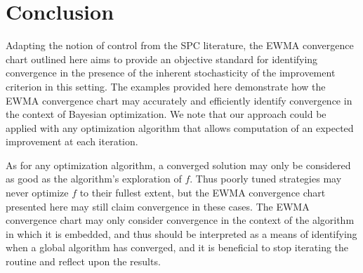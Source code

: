 \documentclass{article}
\begin{document}
%
%

%
%
\section{Conclusion}
%
%

%
Adapting the notion of control from the SPC literature, the EWMA convergence 
chart outlined here aims to provide an objective standard for identifying 
convergence in the presence of the inherent stochasticity of the improvement 
criterion in this setting. The examples provided here demonstrate how the EWMA 
convergence chart may accurately and efficiently identify convergence in the 
context of Bayesian optimization. We note that our approach could be 
applied with any optimization algorithm that allows computation of an expected 
improvement at each iteration.

%
%

As for any optimization algorithm, a converged solution may only be considered 
as good as the algorithm's exploration of $f$. Thus poorly tuned
strategies may never optimize $f$ to their fullest extent, but the  
EWMA convergence chart presented here may still claim convergence in these 
cases. The EWMA convergence chart may only consider convergence in the context 
of the algorithm in which it is embedded, and thus should be interpreted as a 
means of identifying when a global algorithm has converged, and it is
beneficial to stop iterating the routine and reflect upon the results.



%
%
\end{document}
